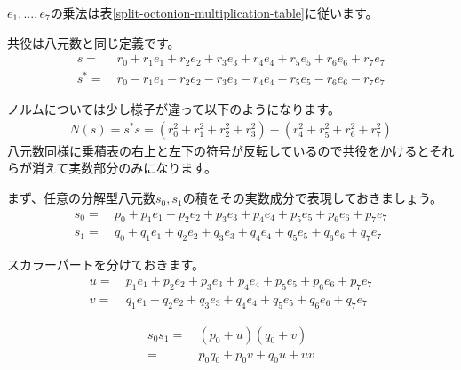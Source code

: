\documentclass[a4paper,12pt,notitlepage]{jsreport}
\begin{document}
$e_1,...,e_7$の乗法は表\ref{split-octonion-multiplication-table}に従います。

共役は八元数と同じ定義です。
\begin{equation}
  \begin{split}
    s=~&r_0+r_1e_1+r_2e_2+r_3e_3+r_4e_4+r_5e_5+r_6e_6+r_7e_7\\
    s^*=~&r_0-r_1e_1-r_2e_2-r_3e_3-r_4e_4-r_5e_5-r_6e_6-r_7e_7
  \end{split}
\end{equation}

ノルムについては少し様子が違って以下のようになります。
\begin{equation}
  \begin{split}
    N(s)=s^*s=(r_0^2+r_1^2+r_2^2+r_3^2)-(r_4^2+r_5^2+r_6^2+r_7^2)
  \end{split}
\end{equation}
八元数同様に乗積表の右上と左下の符号が反転しているので共役をかけるとそれらが消えて実数部分のみになります。

まず、任意の分解型八元数$s_0,s_1$の積をその実数成分で表現しておきましょう。
\begin{equation}
  \begin{split}
    s_0=~&p_0+p_1e_1+p_2e_2+p_3e_3+p_4e_4+p_5e_5+p_6e_6+p_7e_7\\
    s_1=~&q_0+q_1e_1+q_2e_2+q_3e_3+q_4e_4+q_5e_5+q_6e_6+q_7e_7
  \end{split}
\end{equation}

スカラーパートを分けておきます。
\begin{equation}
  \begin{split}
    u=~&p_1e_1+p_2e_2+p_3e_3+p_4e_4+p_5e_5+p_6e_6+p_7e_7\\
    v=~&q_1e_1+q_2e_2+q_3e_3+q_4e_4+q_5e_5+q_6e_6+q_7e_7
  \end{split}
\end{equation}

\begin{equation}
  \begin{split}
    s_0s_1=~&(p_0+u)(q_0+v)\\
    =~&p_0q_0+p_0v+q_0u+uv
  \end{split}
\end{equation}
\end{document}
